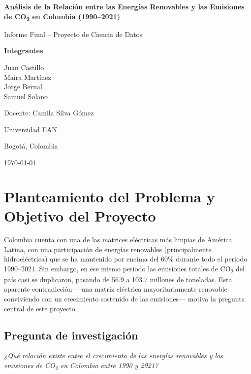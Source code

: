 \documentclass[11pt]{article}
\begin{document}
\begin{titlepage}
    \centering
    \vspace*{2cm}
    {\Huge\bfseries\color{black} Análisis de la Relación entre las Energías Renovables y las Emisiones de CO\textsubscript{2} en Colombia (1990--2021)\par}
    \vspace{1.5cm}
    {\Large Informe Final -- Proyecto de Ciencia de Datos\par}
    \vspace{2cm}
    {\large\bfseries Integrantes\par}
    \vspace{0.3cm}
    {\large
    Juan Castillo \\
    Maira Martínez \\
    Jorge Bernal \\
    Samuel Solano \par}
    \vspace{2cm}
    {\large Docente: Camila Silva Gómez\par}
    \vspace{0.3cm}
    {\large Universidad EAN\par}
    \vspace{0.3cm}
    {\large Bogotá, Colombia \par}
    \vfill
    {\large \today\par}
\end{titlepage}

\tableofcontents
\newpage

\section{Planteamiento del Problema y Objetivo del Proyecto}

Colombia cuenta con una de las matrices eléctricas más limpias de América Latina, con una participación de energías renovables (principalmente hidroeléctrica) que se ha mantenido por encima del 60\% durante todo el periodo 1990--2021. Sin embargo, en ese mismo periodo las emisiones totales de CO\textsubscript{2} del país casi se duplicaron, pasando de 56.9 a 103.7 millones de toneladas. Esta aparente contradicción —una matriz eléctrica mayoritariamente renovable conviviendo con un crecimiento sostenido de las emisiones— motiva la pregunta central de este proyecto.

\subsection*{Pregunta de investigación}
\textit{¿Qué relación existe entre el crecimiento de las energías renovables y las emisiones de CO\textsubscript{2} en Colombia entre 1990 y 2021?}
\end{document}
